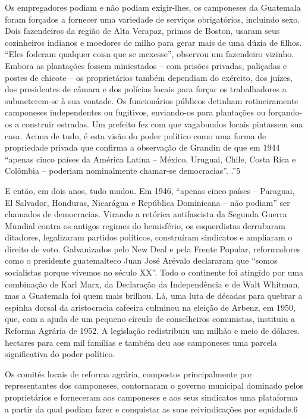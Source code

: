 Os empregadores podiam e não podiam exigir-lhes, os camponeses da Guatemala foram forçados a fornecer uma variedade de serviços obrigatórios, incluindo sexo. Dois fazendeiros da região de Alta Verapaz, primos de Boston, usaram seus cozinheiros indianos e moedores de milho para gerar mais de uma dúzia de filhos. “Eles foderam qualquer coisa que se mexesse”, observou um fazendeiro vizinho. Embora as plantações fossem miniestados – com prisões privadas, paliçadas e postes de chicote – os proprietários também dependiam do exército, dos juízes, dos presidentes de câmara e dos polícias locais para forçar os trabalhadores a submeterem-se à sua vontade. Os funcionários públicos detinham rotineiramente camponeses independentes ou fugitivos, enviando-os para plantações ou forçando-os a construir estradas. Um prefeito fez com que vagabundos locais pintassem sua casa. Acima de tudo, é esta visão do poder político como uma forma de propriedade privada que confirma a observação de Grandin de que em 1944 “apenas cinco países da América Latina – México, Uruguai, Chile, Costa Rica e Colômbia – poderiam nominalmente chamar-se democracias”. .”{\color{blue}5}
 \par 
E então, em dois anos, tudo mudou. Em 1946, “apenas cinco países – Paraguai, El Salvador, Honduras, Nicarágua e República Dominicana – não podiam” ser chamados de democracias. Virando a retórica antifascista da Segunda Guerra Mundial contra os antigos regimes do hemisfério, os esquerdistas derrubaram ditadores, legalizaram partidos políticos, construíram sindicatos e ampliaram o direito de voto. Galvanizados pelo New Deal e pela Frente Popular, reformadores como o presidente guatemalteco Juan José Arévalo declararam que “somos socialistas porque vivemos no século XX”. Todo o continente foi atingido por uma combinação de Karl Marx, da Declaração da Independência e de Walt Whitman, mas a Guatemala foi quem mais brilhou. Lá, uma luta de décadas para quebrar a espinha dorsal da aristocracia cafeeira culminou na eleição de Arbenz, em 1950, que, com a ajuda de um pequeno círculo de conselheiros comunistas, instituiu a Reforma Agrária de 1952. A legislação redistribuiu um milhão e meio de dólares. hectares para cem mil famílias e também deu aos camponeses uma parcela significativa do poder político.
 \par 
Os comités locais de reforma agrária, compostos principalmente por representantes dos camponeses, contornaram o governo municipal dominado pelos proprietários e forneceram aos camponeses e aos seus sindicatos uma plataforma a partir da qual podiam fazer e conquistar as suas reivindicações por equidade.{\color{blue}6}
